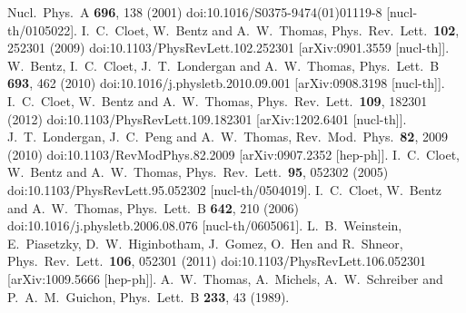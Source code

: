 \documentclass[twocolumn]{revtex4}
\begin{document}
\begin{thebibliography}{25}
  Nucl.\ Phys.\ A {\bf 696}, 138 (2001)
  doi:10.1016/S0375-9474(01)01119-8
  [nucl-th/0105022].
%
  I.~C.~Cloet, W.~Bentz and A.~W.~Thomas,
  Phys.\ Rev.\ Lett.\  {\bf 102}, 252301 (2009)
  doi:10.1103/PhysRevLett.102.252301
  [arXiv:0901.3559 [nucl-th]].
%
  W.~Bentz, I.~C.~Cloet, J.~T.~Londergan and A.~W.~Thomas,
  Phys.\ Lett.\ B {\bf 693}, 462 (2010)
  doi:10.1016/j.physletb.2010.09.001
  [arXiv:0908.3198 [nucl-th]].
%
  I.~C.~Cloet, W.~Bentz and A.~W.~Thomas,
  Phys.\ Rev.\ Lett.\  {\bf 109}, 182301 (2012)
  doi:10.1103/PhysRevLett.109.182301
  [arXiv:1202.6401 [nucl-th]].
%
  J.~T.~Londergan, J.~C.~Peng and A.~W.~Thomas,
  Rev.\ Mod.\ Phys.\  {\bf 82}, 2009 (2010)
  doi:10.1103/RevModPhys.82.2009
  [arXiv:0907.2352 [hep-ph]].
%
  I.~C.~Cloet, W.~Bentz and A.~W.~Thomas,
  Phys.\ Rev.\ Lett.\  {\bf 95}, 052302 (2005)
  doi:10.1103/PhysRevLett.95.052302
  [nucl-th/0504019].
%
  I.~C.~Cloet, W.~Bentz and A.~W.~Thomas,
  Phys.\ Lett.\ B {\bf 642}, 210 (2006)
  doi:10.1016/j.physletb.2006.08.076
  [nucl-th/0605061].
%
  L.~B.~Weinstein, E.~Piasetzky, D.~W.~Higinbotham, J.~Gomez, O.~Hen and R.~Shneor,
  Phys.\ Rev.\ Lett.\  {\bf 106}, 052301 (2011)
  doi:10.1103/PhysRevLett.106.052301
  [arXiv:1009.5666 [hep-ph]].
%
  A.~W.~Thomas, A.~Michels, A.~W.~Schreiber and P.~A.~M.~Guichon,
  Phys.\ Lett.\ B {\bf 233}, 43 (1989).

\end{thebibliography}
\end{document}
